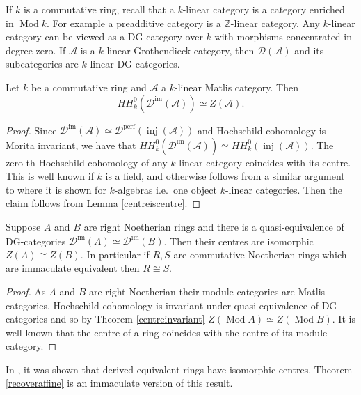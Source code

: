 \documentclass[12pt,oneside]{amsart}
\DeclareMathOperator{\Mod}{Mod}
\DeclareMathOperator{\perf}{perf}
\DeclareMathOperator{\inj}{inj}
\DeclareMathOperator{\immac}{im}
\begin{document}
If $k$ is a commutative ring, recall that a $k$-linear category is a category enriched in $\Mod k$. For example a preadditive category is a $\mathbb{Z}$-linear category. Any $k$-linear category can be viewed as a DG-category over $k$ with morphisms concentrated in degree zero. If $\mathcal{A}$ is a $k$-linear Grothendieck category, then $\mathcal{D}(\mathcal{A})$ and its subcategories are $k$-linear DG-categories. 


\begin{theorem} \label{centreinvariant}
Let $k$ be a commutative ring and $\mathcal{A}$ a $k$-linear Matlis category. Then 
\[
HH^0_k(\mathcal{D}^{\immac}(\mathcal{A})) \simeq Z(\mathcal{A}). 
\]
\end{theorem}

\begin{proof}
Since $\mathcal{D}^{\immac}(\mathcal{A}) \simeq \mathcal{D}^{\perf}(\inj(\mathcal{A}))$ and Hochschild cohomology is Morita invariant, we have that $HH^0_k(\mathcal{D}^{\immac}(\mathcal{A})) \simeq HH^0_k(\inj(\mathcal{A}))$. The zero-th Hochschild cohomology of any $k$-linear category coincides with its centre. This is well known if $k$ is a field, and otherwise follows from a similar argument to \cite[pp.\ 182]{Shuk61} where it is shown for $k$-algebras i.e.\ one object $k$-linear categories. Then the claim follows from Lemma \ref{centreiscentre}.
\end{proof}

\begin{cor} \label{recoveraffine}
Suppose $A$ and $B$ are right Noetherian rings and there is a quasi-equivalence of DG-categories $\mathcal{D}^{\immac}(A) \simeq \mathcal{D}^{\immac}(B)$. Then their centres are isomorphic $Z(A) \cong Z(B)$. In particular if $R,S$ are commutative Noetherian rings which are immaculate equivalent then $R \cong S$.
\end{cor}

\begin{proof}
As $A$ and $B$ are right Noetherian their module categories are Matlis categories. Hochschild cohomology is invariant under quasi-equivalence of DG-categories and so by Theorem \ref{centreinvariant} $Z(\Mod A) \simeq Z(\Mod B)$. It is well known that the centre of a ring coincides with the centre of its module category.
\end{proof}

\begin{remark}
In \cite{Ric89}, it was shown that derived equivalent rings have isomorphic centres. Theorem \ref{recoveraffine} is an immaculate version of this result.  
\end{remark}
\end{document}
